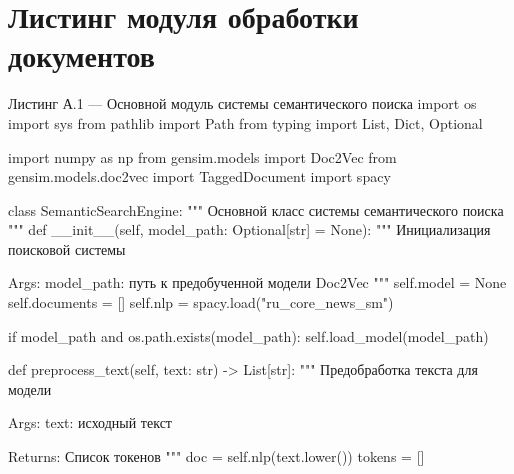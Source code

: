 

\section*{Листинг модуля обработки документов}


\begin{manuallisting}[language=Python]{Листинг А.1 --- Основной модуль системы семантического поиска}
	import os
	import sys
	from pathlib import Path
	from typing import List, Dict, Optional
	
	import numpy as np
	from gensim.models import Doc2Vec
	from gensim.models.doc2vec import TaggedDocument
	import spacy
	
	class SemanticSearchEngine:
	"""
	Основной класс системы семантического поиска
	"""
	def __init__(self, model_path: Optional[str] = None):
	"""
	Инициализация поисковой системы
	
	Args:
	model_path: путь к предобученной модели Doc2Vec
	"""
	self.model = None
	self.documents = []
	self.nlp = spacy.load("ru_core_news_sm")
	
	if model_path and os.path.exists(model_path):
	self.load_model(model_path)
	
	def preprocess_text(self, text: str) -> List[str]:
	"""
	Предобработка текста для модели
	
	Args:
	text: исходный текст
	
	Returns:
	Список токенов
	"""
	doc = self.nlp(text.lower())
	tokens = []
	
\end{manuallisting}

\clearpage


